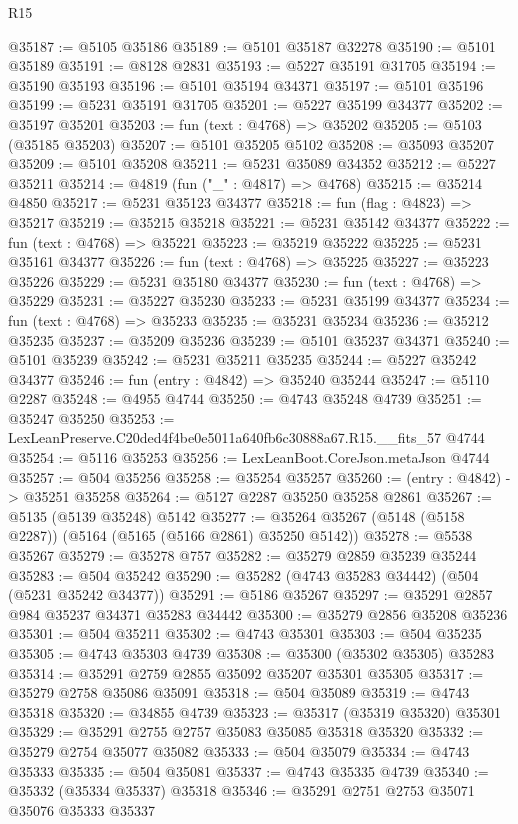 \begin{lexlean}{R15}
\begin{coremodule}
{{{{{{{{{{{@35187 := @5105 @35186
@35189 := @5101 @35187 @32278
@35190 := @5101 @35189
@35191 := @8128 @2831
@35193 := @5227 @35191 @31705
@35194 := @35190 @35193
@35196 := @5101 @35194 @34371
@35197 := @5101 @35196
@35199 := @5231 @35191 @31705
@35201 := @5227 @35199 @34377
@35202 := @35197 @35201
@35203 := fun (text : @4768) => @35202
@35205 := @5103 (@35185 @35203)
@35207 := @5101 @35205 @5102
@35208 := @35093 @35207
@35209 := @5101 @35208
@35211 := @5231 @35089 @34352
@35212 := @5227 @35211
@35214 := @4819 (fun ("_" : @4817) => @4768)
@35215 := @35214 @4850
@35217 := @5231 @35123 @34377
@35218 := fun (flag : @4823) => @35217
@35219 := @35215 @35218
@35221 := @5231 @35142 @34377
@35222 := fun (text : @4768) => @35221
@35223 := @35219 @35222
@35225 := @5231 @35161 @34377
@35226 := fun (text : @4768) => @35225
@35227 := @35223 @35226
@35229 := @5231 @35180 @34377
@35230 := fun (text : @4768) => @35229
@35231 := @35227 @35230
@35233 := @5231 @35199 @34377
@35234 := fun (text : @4768) => @35233
@35235 := @35231 @35234
@35236 := @35212 @35235
@35237 := @35209 @35236
@35239 := @5101 @35237 @34371
@35240 := @5101 @35239
@35242 := @5231 @35211 @35235
@35244 := @5227 @35242 @34377
@35246 := fun (entry : @4842) => @35240 @35244
@35247 := @5110 @2287
@35248 := @4955 @4744
@35250 := @4743 @35248 @4739
@35251 := @35247 @35250
@35253 := LexLeanPreserve.C20ded4f4be0e5011a640fb6c30888a67.R15.__fits_57 @4744
@35254 := @5116 @35253
@35256 := LexLeanBoot.CoreJson.metaJson @4744
@35257 := @504 @35256
@35258 := @35254 @35257
@35260 := (entry : @4842) -> @35251 @35258
@35264 := @5127 @2287 @35250 @35258 @2861
@35267 := @5135 (@5139 @35248) @5142
@35277 := @35264 @35267 (@5148 (@5158 @2287)) (@5164 (@5165 (@5166 @2861) @35250 @5142))
@35278 := @5538 @35267
@35279 := @35278 @757
@35282 := @35279 @2859 @35239 @35244
@35283 := @504 @35242
@35290 := @35282 (@4743 @35283 @34442) (@504 (@5231 @35242 @34377))
@35291 := @5186 @35267
@35297 := @35291 @2857 @984 @35237 @34371 @35283 @34442
@35300 := @35279 @2856 @35208 @35236
@35301 := @504 @35211
@35302 := @4743 @35301
@35303 := @504 @35235
@35305 := @4743 @35303 @4739
@35308 := @35300 (@35302 @35305) @35283
@35314 := @35291 @2759 @2855 @35092 @35207 @35301 @35305
@35317 := @35279 @2758 @35086 @35091
@35318 := @504 @35089
@35319 := @4743 @35318
@35320 := @34855 @4739
@35323 := @35317 (@35319 @35320) @35301
@35329 := @35291 @2755 @2757 @35083 @35085 @35318 @35320
@35332 := @35279 @2754 @35077 @35082
@35333 := @504 @35079
@35334 := @4743 @35333
@35335 := @504 @35081
@35337 := @4743 @35335 @4739
@35340 := @35332 (@35334 @35337) @35318
@35346 := @35291 @2751 @2753 @35071 @35076 @35333 @35337
}}}}}}}}}}}
\end{coremodule}
\end{lexlean}
